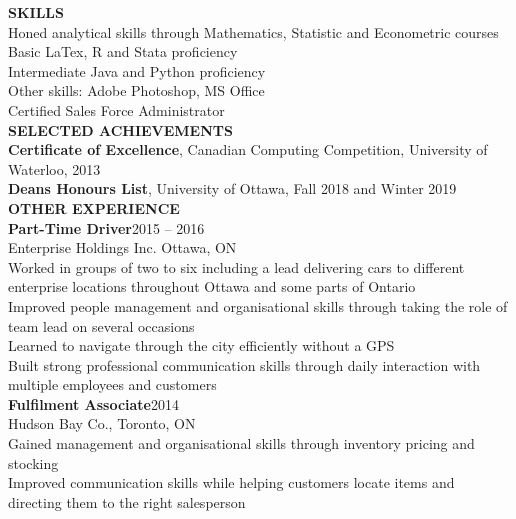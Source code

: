 {\parindent0pt
\textbf{\large{SKILLS}}\\
\raisebox{0.25ex}{\tiny$\bullet$} Honed analytical skills through Mathematics, Statistic and Econometric courses \\
\raisebox{0.25ex}{\tiny$\bullet$} Basic LaTex, R and Stata proficiency \\
\raisebox{0.25ex}{\tiny$\bullet$} Intermediate Java and Python proficiency \\ 
\raisebox{0.25ex}{\tiny$\bullet$} Other skills: Adobe Photoshop, MS Office \\
\raisebox{0.25ex}{\tiny$\bullet$} Certified Sales Force Administrator \\

\textbf{\large{SELECTED ACHIEVEMENTS}}\\
\textbf{Certificate of Excellence}, Canadian Computing Competition, University of Waterloo, 2013\\
\textbf{Deans Honours List}, University of Ottawa, Fall 2018 and Winter 2019\\

\textbf{\large{OTHER EXPERIENCE}}\\
\textbf{Part-Time Driver}\hfill 2015 – 2016\\
Enterprise Holdings Inc. Ottawa, ON\\
\raisebox{0.25ex}{\tiny$\bullet$} Worked in groups of two to six including a lead delivering cars to different enterprise locations throughout Ottawa and some parts of Ontario\\
\raisebox{0.25ex}{\tiny$\bullet$} Improved people management and organisational skills through taking the role of team lead on several occasions\\
\raisebox{0.25ex}{\tiny$\bullet$} Learned to navigate through the city efficiently without a GPS\\
\raisebox{0.25ex}{\tiny$\bullet$} Built strong professional communication skills through daily interaction with multiple employees and customers \\

\textbf{Fulfilment Associate}\hfill 2014\\
Hudson Bay Co., Toronto, ON\\
\raisebox{0.25ex}{\tiny$\bullet$} Gained management and organisational skills through inventory pricing and stocking\\
\raisebox{0.25ex}{\tiny$\bullet$} Improved communication skills while helping customers locate items and directing them to the right salesperson\\
 
}
